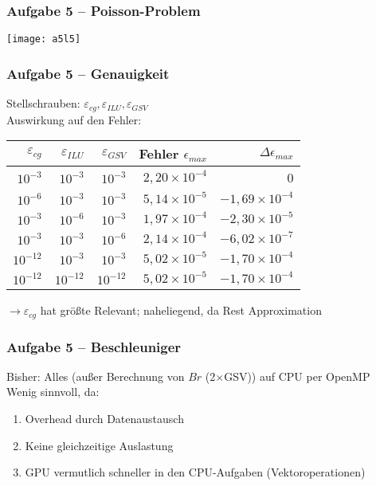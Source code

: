 \documentclass[german,notes,18pt]{beamer}
\begin{document}
	\begin{frame}
		\frametitle{Aufgabe 5 -- Poisson-Problem}
		\vspace{-10em}
		\begin{center}
			\texttt{[image: a5l5]}
		\end{center}
	\end{frame}
	\begin{frame}
		\frametitle{Aufgabe 5 -- Genauigkeit}
		Stellschrauben: $\varepsilon_{cg}, \varepsilon_{ILU}, \varepsilon_{GSV}$ \\
		\vspace{2em}
		Auswirkung auf den Fehler:
		\begin{center}
			\begin{tabular}{r|r|r|r|r}
				$\varepsilon_{cg}$ & $\varepsilon_{ILU}$ & $\varepsilon_{GSV}$ & Fehler $\epsilon_{max}$ & $\Delta\epsilon_{max}$ \\
				\hline
				$10^{-3}$ & $10^{-3}$ & $10^{-3}$ & $2,20\times10^{-4}$ & 0 \\
				$10^{-6}$ & $10^{-3}$ & $10^{-3}$ & $5,14\times10^{-5}$ & $-1,69\times10^{-4}$ \\
				$10^{-3}$ & $10^{-6}$ & $10^{-3}$ & $1,97\times10^{-4}$ & $-2,30\times10^{-5}$ \\
				$10^{-3}$ & $10^{-3}$ & $10^{-6}$ & $2,14\times10^{-4}$ & $-6,02\times10^{-7}$ \\
				$10^{-12}$ & $10^{-3}$ & $10^{-3}$ & $5,02\times10^{-5}$ & $-1,70\times10^{-4}$ \\
				$10^{-12}$ & $10^{-12}$ & $10^{-12}$ & $5,02\times10^{-5}$ & $-1,70\times10^{-4}$
			\end{tabular}
		\end{center}
	\vspace{2em}
	$\rightarrow$$\varepsilon_{cg}$ hat größte Relevant; naheliegend, da Rest Approximation
	\end{frame}
	\begin{frame}
		\frametitle{Aufgabe 5 -- Beschleuniger}
		Bisher: Alles (außer Berechnung von $Br$ (2$\times$GSV)) auf CPU per OpenMP \\
		\vspace{2em}
		Wenig sinnvoll, da:
		\begin{enumerate}
			\item Overhead durch Datenaustausch
			\item Keine gleichzeitige Auslastung
			\item GPU vermutlich schneller in den CPU-Aufgaben (Vektoroperationen)
		\end{enumerate}
	\end{frame}
\end{document}
